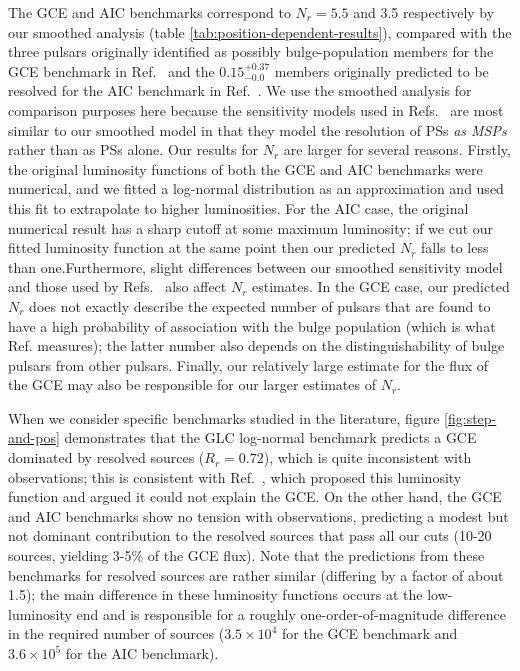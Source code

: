 \documentclass[letter,11pt]{article}
\begin{document}
The GCE and AIC benchmarks correspond to $N_r=5.5$ and 3.5 respectively by our smoothed analysis (table \ref{tab:position-dependent-results}), compared with the three pulsars originally identified as possibly bulge-population members for the GCE benchmark in Ref.~\cite{Ploeg:2020jeh} and the $0.15^{+0.37}_{-0.0}$ members originally predicted to be resolved for the AIC benchmark in Ref.~\cite{Gautam:2021wqn}. We use the smoothed analysis for comparison purposes here because the sensitivity models used in Refs.~\cite{Ploeg:2020jeh,Gautam:2021wqn} are most similar to our smoothed model in that they model the resolution of PSs \textit{as MSPs} rather than as PSs alone. Our results for $N_r$ are larger for several reasons. Firstly, the original luminosity functions of both the GCE and AIC benchmarks were numerical, and we fitted a log-normal distribution as an approximation and used this fit to extrapolate to higher luminosities. For the AIC case, the original numerical result has a sharp cutoff at some maximum luminosity; if we cut our fitted luminosity function at the same point then our predicted $N_r$ falls to less than one.Furthermore, slight differences between our smoothed sensitivity model and those used by Refs.~\cite{Ploeg:2020jeh,Gautam:2021wqn} also affect $N_r$ estimates. In the GCE case, our predicted $N_r$ does not exactly describe the expected number of pulsars that are found to have a high probability of association with the bulge population (which is what Ref. \cite{Ploeg:2020jeh} measures); the latter number also depends on the distinguishability of bulge pulsars from other pulsars. Finally, our relatively large estimate for the flux of the GCE may also be responsible for our larger estimates of $N_r$.

When we consider specific benchmarks studied in the literature, figure \ref{fig:step-and-pos} demonstrates that the GLC log-normal benchmark predicts a GCE dominated by resolved sources ($R_r = 0.72$), which is quite inconsistent with observations; this is consistent with Ref.~\cite{Hooper16}, which proposed this luminosity function and argued it could not explain the GCE. On the other hand, the GCE and AIC benchmarks show no tension with observations, predicting a modest but not dominant contribution to the resolved sources that pass all our cuts (10-20 sources, yielding 3-5\% of the GCE flux). Note that the predictions from these benchmarks for resolved sources are rather similar (differing by a factor of about 1.5); the main difference in these luminosity functions occurs at the low-luminosity end and is responsible for a roughly one-order-of-magnitude difference in the required number of sources ($3.5\times 10^4$ for the GCE benchmark and $3.6\times 10^5$ for the AIC benchmark).
\end{document}
